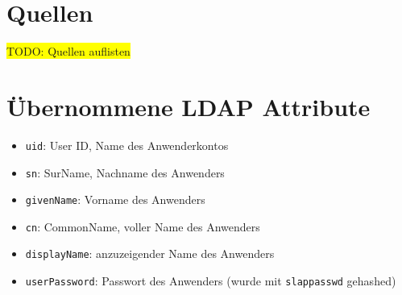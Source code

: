 \documentclass[11pt,a4paper,titlepage=firstiscover,headsepline,bibtotoc]{scrartcl} %
\newcommand{\hilight}[1]{\colorbox{yellow}{#1}} %
\begin{document}
\newpage
\section*{Quellen}
\hilight{TODO: Quellen auflisten}

\appendix
\newpage
{} %
\section{Übernommene LDAP Attribute} \label{sec:LDAP-Attribute}
\begin{itemize}
\item\texttt{uid}: User ID, Name des Anwenderkontos
\item\texttt{sn}: SurName, Nachname des Anwenders
\item\texttt{givenName}: Vorname des Anwenders
\item\texttt{cn}: CommonName, voller Name des Anwenders
\item\texttt{displayName}: anzuzeigender Name des Anwenders
\item\texttt{userPassword}: Passwort des Anwenders (wurde mit \texttt{slappasswd} gehashed)
\end{itemize}

\newpage
\end{document}
